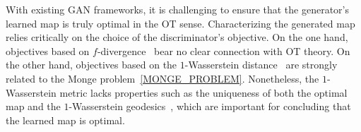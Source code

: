 \documentclass[runningheads]{llncs}
\begin{document}

With existing GAN frameworks, it is challenging to ensure that the generator's learned map is truly optimal in the OT sense. Characterizing the generated map relies critically on the choice of the discriminator's objective. On the one hand, objectives based on $f$-divergence~\citep{goodfellow2014generative,NIPS2016_6066} bear no clear connection with OT theory. On the other hand,
objectives based on the $1$-Wasserstein distance~\citep{arjovsky2017wasserstein} are strongly related to the Monge problem~\eqref{MONGE_PROBLEM}. Nonetheless, the $1$-Wasserstein metric lacks properties such as the uniqueness of both the optimal map and the $1$-Wasserstein geodesics~\citep{bottou2018geometrical}, which are important for concluding that the learned map is optimal. %
\end{document}
